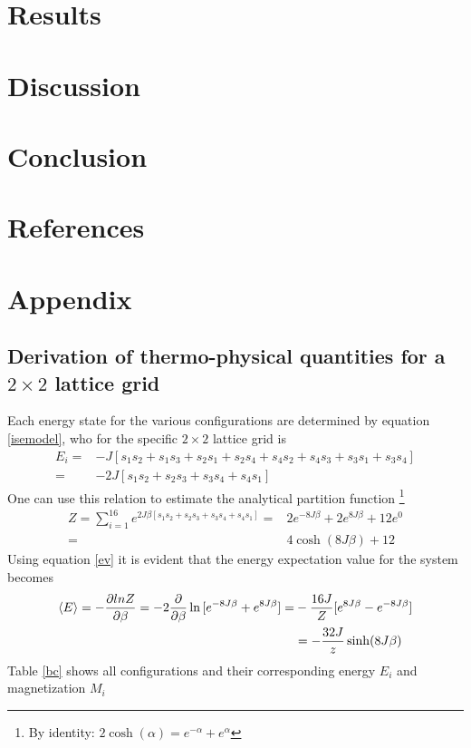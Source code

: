 \documentclass[%
reprint,nofootinbib,
amsmath,amssymb,
aps,
]{revtex4-1}
\begin{document}
\section{Results} \noindent

\section{Discussion} \noindent 
\section{Conclusion} \noindent 
\onecolumngrid 
\section{References} \noindent
\newpage
\section{Appendix} \noindent
\subsection{Derivation of thermo-physical quantities for a $2\times 2$ lattice grid}
Each energy state for the various configurations are determined by equation \ref{isemodel}, who for the specific $2\times2$ lattice grid is
\begin{align*}
E_i  =& -J[s_1s_2 + s_1s_3 + s_2s_1+s_2s_4+s_4s_2+s_4s_3 + s_3s_1 + s_3s_4] \nonumber \\
= &-2J[s_1s_2 + s_2s_3 + s_3s_4 + s_4s_1]
\end{align*}\vspace{1mm} 
One can use this relation to estimate the analytical partition function \footnote{By identity: $2\cosh(\alpha) = e^{-\alpha} + e^{\alpha}$}
\begin{align*}
Z = \sum_{i = 1}^{16}e^{2J\beta[s_1s_2 + s_2s_3 + s_3s_4 + s_4s_1]}
=&  2e^{-8J\beta} + 2e^{8J\beta} + 12e^0\nonumber \\
= & 4\cosh(8J\beta) + 12 
\end{align*} 
Using equation \ref{ev} it is evident that the energy expectation value for the system becomes 
\begin{align*}
\expval{E} = -\dfrac{\partial ln Z}{\partial \beta} = -2\dfrac{\partial}{\partial \beta}\ln{[e^{-8J\beta} + e^{8J\beta}]} =& -\dfrac{16J}{Z}[e^{8J\beta} - e^{-8J\beta}] \\ 
& = -\dfrac{32J}{z}\sinh(8J\beta)
\end{align*}
Table \ref{bc} shows all configurations and their corresponding energy $E_i$ and magnetization $M_i$
\end{document}
